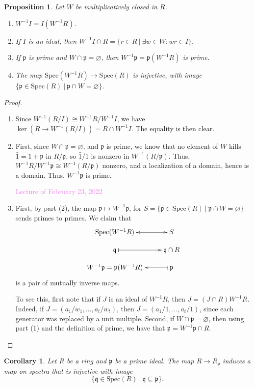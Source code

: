 \documentclass{amsart}[12pt]
\def\ker{\operatorname{ker}}
\newcommand{\Feb}[1]{\textcolor{violet}{Lecture of February #1, 2022}}
\newcommand{\p}{{\mathfrak p}}
\newcommand{\q}{{\mathfrak q}}
\numberwithin{equation}{section}
\theoremstyle{plain} %
\newtheorem{corollary}[equation]{Corollary}
\newtheorem{proposition}[equation]{Proposition}
\theoremstyle{definition}
\theoremstyle{remark}
\newcommand{\Spec}{\mathrm{Spec}}
\begin{document}
\begin{proposition}
	Let $W$ be multiplicatively closed in $R$.
	\begin{enumerate}
	\item[(0)] $W^{-1} I = I(W^{-1} R)$.
		\item If $I$ is an ideal, then $W^{-1} I \cap R = \{ r \in R \ | \ \exists w\in W : wr\in I\}$.
		\item If $\p$ is prime and $W \cap \p=\varnothing$, then $W^{-1}\p =\p (W^{-1}R)$ is prime.
		\item The map $\Spec(W^{-1} R) \to \Spec(R)$ is injective, with image $\{\p \in \Spec(R) \ | \ \p \cap W = \varnothing\}$.
	\end{enumerate}

\end{proposition}
\begin{proof}
	\begin{enumerate}

		\item Since $W^{-1}(R/I) \cong W^{-1} R / W^{-1} I$, we have $\ker (R \to W^{-1}(R/I)) = R \cap W^{-1} I$. The equality is then clear.
		\item First, since $W\cap \p =\varnothing$, and $\p$ is prime, we know that no element of $W$ kills $\bar{1}=1 + \p$ in $R/\p$, so $\bar{1}/1$ is nonzero in $W^{-1}(R/\p)$. Thus, $W^{-1}R / W^{-1}\p \cong W^{-1}(R/\p)$ nonzero, and a localization of a domain, hence is a domain. Thus, $W^{-1}\p$ is prime.
	
	\Feb{23}
		\item First, by part (2), the map $\p \mapsto W^{-1}\p$, for $S=\{\p \in \Spec(R) \ | \ \p \cap W = \varnothing\}$ sends primes to primes. We claim that 
	\[\xymatrix@R=1em{  \Spec(W^{-1} R) \ar@{<->}[r] & S \\
	\q  \ar@{|->}[r] &  \q \cap R \\
	W^{-1}\p=\p (W^{-1}R) \ar@{<-|}[r] & \p}\]
		is a pair of mutually inverse maps.
		
	To see this, first note that if $J$ is an ideal of $W^{-1}R$, then $J=(J\cap R) W^{-1}R$. Indeed, if $J=(a_1/w_1,\dots,a_t/w_t)$, then  $J=(a_1/1,\dots,a_t/1)$, since each generator was replaced by a unit multiple. Second, if $W\cap \p=\varnothing$, then using part (1) and the definition of prime, we have that $\p = W^{-1}\p \cap R$.\qedhere
	\end{enumerate}
\end{proof}

\begin{corollary}
Let $R$ be a ring and $\p$ be a prime ideal. The map $R\to R_{\p}$ induces a map on spectra that is injective with image
\[ \{ \q \in \Spec(R) \ | \ \q \subseteq \p \}.\]
\end{corollary}
\end{document}
